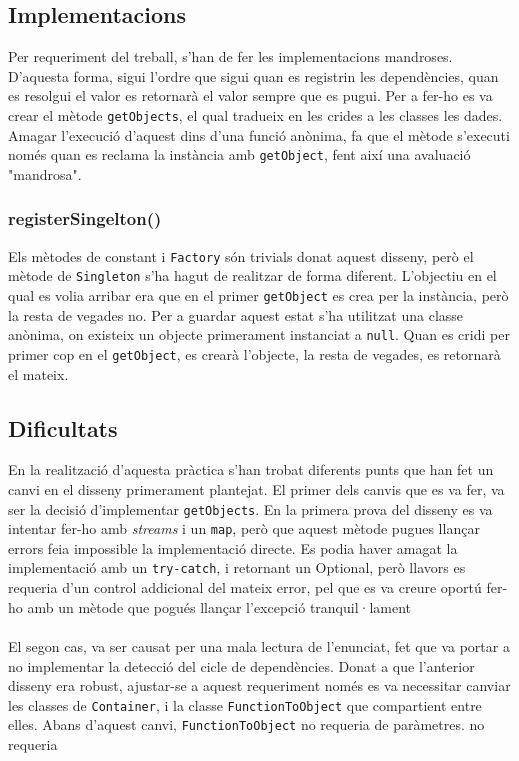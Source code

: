 \subsection{Implementacions}
Per requeriment del treball, s'han de fer les implementacions mandroses. D'aquesta forma, sigui l'ordre que sigui quan
es registrin les dependències, quan es resolgui el valor es retornarà el valor sempre que es pugui. Per a fer-ho es va
crear el mètode \texttt{getObjects}, el qual tradueix en les crides a les classes les dades. Amagar l'execució d'aquest
dins d'una funció anònima, fa que el mètode s'executi només quan es reclama la instància amb \texttt{getObject},
fent així una avaluació "mandrosa".
\subsubsection{registerSingelton()}
Els mètodes de constant i \texttt{Factory} són trivials donat aquest disseny, però el mètode de \texttt{Singleton} s'ha
hagut de realitzar de forma diferent. L'objectiu en el qual es volia arribar era que en el primer \texttt{getObject} es
crea per la instància, però la resta de vegades no. Per a guardar aquest estat s'ha utilitzat una classe anònima,
on existeix un objecte primerament instanciat a \texttt{null}. Quan es cridi per primer cop en el \texttt{getObject}, 
es crearà l'objecte, la resta de vegades, es retornarà el mateix.
\subsection{Dificultats}
En la realització d'aquesta pràctica s'han trobat diferents punts que han fet un canvi en el disseny primerament plantejat.
El primer dels canvis que es va fer, va ser la decisió d'implementar \texttt{getObjects}. En la primera prova del disseny es
va intentar fer-ho amb \textit{streams} i un \texttt{map}, però que aquest mètode pugues llançar errors feia impossible
la implementació directe. Es podia haver amagat la implementació amb un \texttt{try-catch}, i retornant un Optional, però
llavors es requeria d'un control addicional del mateix error, pel que es va creure oportú fer-ho amb un mètode que pogués
llançar l'excepció tranquil·lament\\
\\
El segon cas, va ser causat per una mala lectura de l'enunciat, fet que va portar a no implementar la detecció del cicle de 
dependències. Donat a que l'anterior disseny era robust, ajustar-se a aquest requeriment només es va necessitar canviar
les classes de \texttt{Container}, i la classe \texttt{FunctionToObject} que compartient  entre elles. 
Abans d'aquest canvi, \texttt{FunctionToObject} no requeria de paràmetres.
no requeria 
